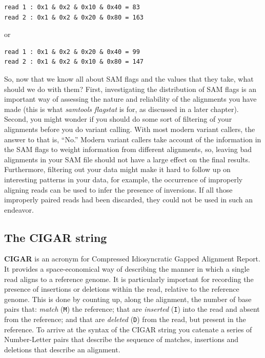 \documentclass[]{krantz}
\begin{document}
\begin{verbatim}
read 1 : 0x1 & 0x2 & 0x10 & 0x40 = 83
read 2 : 0x1 & 0x2 & 0x20 & 0x80 = 163
\end{verbatim}

or

\begin{verbatim}
read 1 : 0x1 & 0x2 & 0x20 & 0x40 = 99
read 2 : 0x1 & 0x2 & 0x10 & 0x80 = 147
\end{verbatim}

So, now that we know all about SAM flags and the values that they take,
what should we do with them? First, investigating the distribution of
SAM flags is an important way of assessing the nature and reliability of
the alignments you have made (this is what \emph{samtools flagstat} is for, as discussed
in a later chapter). Second, you might wonder if you should do some sort
of filtering of your alignments before you do variant calling. With most modern
variant callers, the answer to that is, ``No.'' Modern variant callers take account of
the information in the SAM flags to weight information from different alignments, so,
leaving bad alignments in your SAM file should not have a large effect on the final
results. Furthermore, filtering out your data might make it hard to follow up on interesting patterns in
your data, for example, the occurrence of improperly aligning reads can be used to
infer the presence of inversions. If all those improperly paired reads had been discarded,
they could not be used in such an endeavor.

\hypertarget{cigar}{%
\subsection{The CIGAR string}\label{cigar}}

\textbf{CIGAR} is an acronym for Compressed Idiosyncratic Gapped Alignment Report. It provides a
space-economical way of describing the manner in which a single read aligns to a reference
genome. It is particularly important for recording the presence of insertions or deletions within
the read, relative to the reference genome. This is done by counting up, along the alignment, the
number of base pairs that: \emph{match} (\texttt{M}) the reference; that are \emph{inserted} (\texttt{I}) into the read and
absent from the reference; and that are \emph{deleted} (\texttt{D}) from the read, but present in the reference.
To arrive at the syntax of the CIGAR string you catenate a series of Number-Letter pairs that describe the
sequence of matches, insertions and deletions that describe an alignment.
\end{document}
